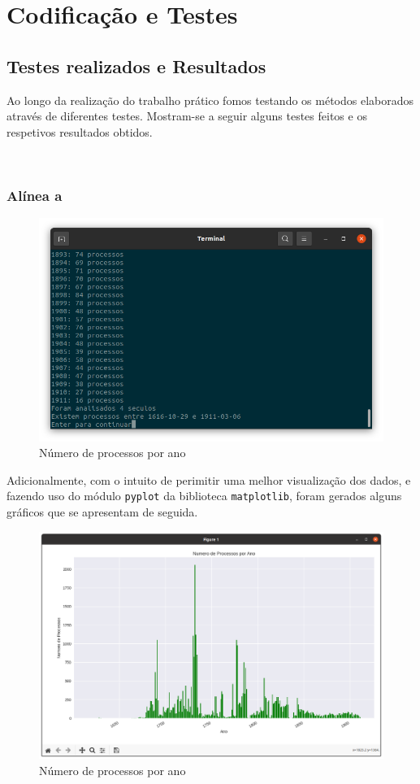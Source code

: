 \documentclass[a4paper, 11pt]{article}
\begin{document}
\pagebreak

\section{Codificação e Testes}
\label{sec:testes}

\subsection{Testes realizados e Resultados}

Ao longo da realização do trabalho prático fomos testando os métodos elaborados através de diferentes
testes.  Mostram-se a seguir alguns testes feitos e os respetivos resultados obtidos.

\

\subsubsection{Alínea a}

\begin{figure}[H]
    \centering
    \includegraphics[width=.9\textwidth]{img/a.png}
    \caption{Número de processos por ano}
\end{figure}

\pagebreak

Adicionalmente, com o intuito de perimitir uma melhor visualização dos dados, e fazendo uso do módulo
\texttt{pyplot} da biblioteca \texttt{matplotlib}, foram gerados alguns gráficos que se apresentam
de seguida.

\begin{figure}[H]
    \centering
    \includegraphics[width=.8\textwidth]{img/m1.png}
    \caption{Número de processos por ano}
\end{figure}
\end{document}
